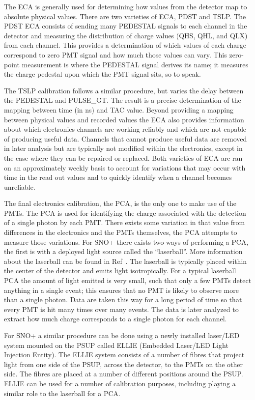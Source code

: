 The ECA is generally used for determining how values from the detector map to absolute
physical values.
There are two varieties of ECA,  PDST and  TSLP.
The PDST ECA consists of sending many PEDESTAL signals to each channel in the detector and
measuring the distribution of charge values (QHS, QHL, and QLX) from each channel.
This provides a determination of which values of each charge correspond to zero PMT
signal and how much those values can vary.
This zero-point measurement is where the PEDESTAL signal derives its name; it measures
the charge pedestal upon which the PMT signal sits, so to speak.

The TSLP calibration follows a similar procedure, but varies the delay between
the PEDESTAL and PULSE\_GT.
The result is a precise determination of the mapping between time (in ns) and
TAC value.
Beyond providing a mapping between physical values and recorded values the ECA
also provides information about which electronics channels are working reliably
and which are not capable of producing useful data.
Channels that cannot produce useful data are removed in later analysis but are
typically not modified within the electronics, except in the case where they
can be repaired or replaced.
Both varieties of ECA are ran on an approximately weekly basis to account for
variations that may occur with time in the read out values and to quickly
identify when a channel becomes unreliable.

The final electronics calibration, the PCA, is the only one to make use of the PMTs.
The PCA is used for identifying the charge associated with the detection of a single
photon by each PMT. There exists some variation in that value from differences in the
electronics and the PMTs themselves, the PCA attempts to measure those variations.
For SNO+ there exists two ways of performing a PCA, the first is with a deployed light
source called the ``laserball''.
More information about the laserball can be found in Ref~\cite{XXX}.
The laserball is typically placed within the center of the
detector and emits light isotropically. For a typical laserball PCA the amount of light emitted
is very small, such that only a few PMTs detect anything in a single event;
this ensures that no PMT is likely to observe more than a single photon.
Data are taken this way for a long period of time so that every PMT is hit many times over
many events. The data is later analyzed to extract how much charge corresponds to a single
photon for each channel.

For SNO+ a similar procedure can be done using a newly installed laser/LED system
mounted on the PSUP called ELLIE (Embedded Laser/LED Light Injection Entity).
The ELLIE system consists of a number of fibres that project light from one
side of the PSUP, across the detector, to the PMTs on the other side.
The fibres are placed at a number of different positions around the PSUP.
ELLIE can be used for a number of calibration purposes, including playing a
similar role to the laserball for a PCA.
